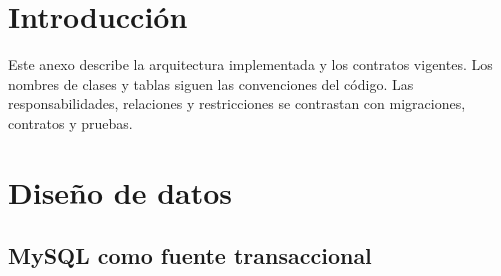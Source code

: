 
\section{Introducción}

Este anexo describe la arquitectura implementada y los contratos vigentes. Los nombres de clases y tablas siguen las convenciones del código. Las responsabilidades, relaciones y restricciones se contrastan con migraciones, contratos y pruebas.

\section{Diseño de datos}

\subsection{MySQL como fuente transaccional}

